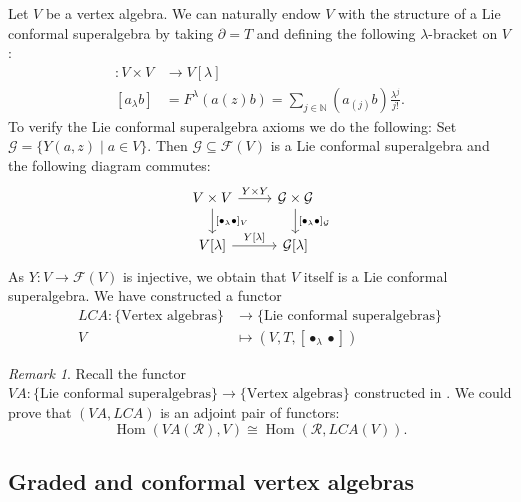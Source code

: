 \documentclass[a4paper, 12pt, reqno]{amsart}
\theoremstyle{remark}
\newtheorem{remark}[theorem]{Remark}
\numberwithin{equation}{subsection}
\DeclareMathOperator{\Hom}{Hom}
\begin{document}
Let $V$ be a vertex algebra.
We can naturally endow $V$ with the structure of a Lie conformal superalgebra by taking $\partial = T$ and defining the following $\lambda$-bracket on $V$:
\begin{align*}
  [\bullet_{\lambda}\bullet]: V \times V &\to V[\lambda] \\
  [a_{\lambda}b] &= F^{\lambda}(a(z)b) = \sum_{j \in \mathbb{N}}(a_{(j)}b)\frac{\lambda^j}{j!}.
\end{align*}
To verify the Lie conformal superalgebra axioms we do the following:
Set $\mathcal{G}=\{Y(a,z)\mid a \in V\}$.
Then $\mathcal{G}\subseteq \mathcal{F}(V)$ is a Lie conformal superalgebra and the following diagram commutes:
\begin{equation*}
  \begin{tikzcd}
    V\times V \arrow[d, "{[\bullet_{\lambda}\bullet]_V}"] \arrow[r, "Y\times Y"] & \mathcal{G}\times\mathcal{G} \arrow[d, "{[\bullet_{\lambda}\bullet]_{\mathcal{G}}}"] \\
    {V[\lambda]} \arrow[r, "{Y[\lambda]}"]                       & {\mathcal{G}[\lambda]}                                                 
  \end{tikzcd}
\end{equation*}
As $Y: V \to \mathcal{F}(V)$ is injective, we obtain that $V$ itself is a Lie conformal superalgebra.
We have constructed a functor
\begin{align*}
  LCA: \{\text{Vertex algebras}\} &\to \{\text{Lie conformal superalgebras}\} \\
  V &\mapsto (V, T, [\bullet_{\lambda}\bullet])
\end{align*}

\begin{remark}
  \label{rmk:15}
  Recall the functor $VA: \{\text{Lie conformal superalgebras}\} \to \{\text{Vertex algebras}\}$ constructed in .
  We could prove that $(VA, LCA)$ is an adjoint pair of functors:
  \begin{equation*}
    \Hom(VA(\mathcal{R}), V) \cong \Hom(\mathcal{R}, LCA(V)).
  \end{equation*}
\end{remark}

\subsection{Graded and conformal vertex algebras}
\label{sec:grad-conf-vert}
\end{document}
